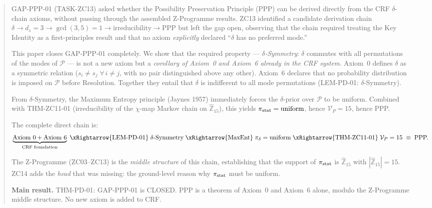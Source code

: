 \documentclass[12pt, a4paper]{article}
\begin{document}
\begin{abstract}
\sloppy
GAP-PPP-01 (TASK-ZC13) asked whether the Possibility Preservation
Principle (PPP) can be derived directly from the CRF $\delta$-chain
axioms, without passing through the assembled Z-Programme results.
ZC13 identified a candidate derivation chain
$\delta \to d_s=3 \to \gcd(3,5)=1 \to \text{irreducibility} \to \text{PPP}$
but left the gap open, observing that the chain required treating
the Key Identity as a first-principles result and that no axiom
\emph{explicitly} declared ``$\delta$ has no preferred mode.''

This paper closes GAP-PPP-01 completely. We show that the required
property --- \emph{$\delta$-Symmetry}: $\delta$ commutes with all
permutations of the modes of $\mathcal{P}$ --- is not a new axiom
but a \emph{corollary of Axiom~0 and Axiom~6 already in the CRF
system}. Axiom~0 defines $\delta$ as a symmetric relation
($s_i \neq s_j \;\forall\, i\neq j$, with no pair distinguished
above any other). Axiom~6 declares that no probability distribution
is imposed on $\mathcal{P}$ before Resolution. Together they entail
that $\delta$ is indifferent to all mode permutations
(LEM-PD-01: $\delta$-Symmetry).

From $\delta$-Symmetry, the Maximum Entropy principle
(Jaynes 1957) immediately forces the $\delta$-prior over
$\mathcal{P}$ to be uniform. Combined with
THM-ZC11-01 (irreducibility of the $\chi$-map Markov chain on
$\widehat{\mathbb{Z}}_{15}$), this yields
$\pi_{\rm stat} = \text{uniform}$, hence
$\mathcal{V}_P = 15$, hence PPP.

The complete direct chain is:
\[
  \underbrace{\text{Axiom~0} + \text{Axiom~6}}_{\text{CRF foundation}}
  \;\xRightarrow{\text{LEM-PD-01}}\;
  \delta\text{-Symmetry}
  \;\xRightarrow{\text{MaxEnt}}\;
  \pi_\delta = \text{uniform}
  \;\xRightarrow{\text{THM-ZC11-01}}\;
  \mathcal{V}_P = 15
  \;\equiv\; \text{PPP.}
\]

The Z-Programme (ZC03--ZC13) is the \emph{middle structure} of this
chain, establishing that the support of $\pi_{\rm stat}$ is
$\widehat{\mathbb{Z}}_{15}$ with $|\widehat{\mathbb{Z}}_{15}|=15$.
ZC14 adds the \emph{head} that was missing: the ground-level reason
why $\pi_{\rm stat}$ must be uniform.

\textbf{Main result.} THM-PD-01: GAP-PPP-01 is CLOSED. PPP is a
theorem of Axiom~0 and Axiom~6 alone, modulo the Z-Programme
middle structure. No new axiom is added to CRF.
\end{abstract}
\end{document}
